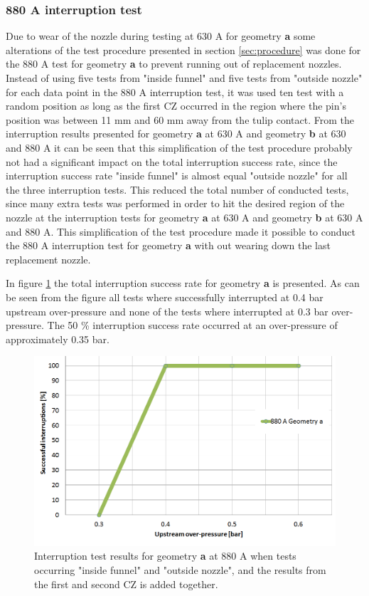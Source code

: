 \documentclass[10pt,b5paper,twoside]{article}
\begin{document}
\subsubsection*{880 A interruption test}
Due to wear of the nozzle during testing at 630 A for geometry \textbf{a} some alterations of the test procedure presented in section \ref{sec:procedure} was done for the 880 A test for geometry \textbf{a} to prevent running out of replacement nozzles. Instead of using five tests from "inside funnel" and five tests from "outside nozzle" for each data point in the 880 A interruption test, it was used ten test with a random position as long as the first CZ occurred in the region where the pin's position was between 11 mm and 60 mm away from the tulip contact. From the interruption results presented for geometry \textbf{a} at 630 A and geometry \textbf{b} at 630 and 880 A it can be seen that this simplification of the test procedure probably not had a significant impact on the total interruption success rate, since the interruption success rate "inside funnel" is almost equal "outside nozzle" for all the three interruption tests. This reduced the total number of conducted tests, since many extra tests was performed in order to hit the desired region of the nozzle at the interruption tests for geometry \textbf{a} at 630 A and geometry \textbf{b} at 630 A and 880 A. This simplification of the test procedure made it possible to conduct the 880 A interruption test for geometry \textbf{a} with out wearing down the last replacement nozzle.

In figure \ref{fig:results880AgeoA} the total interruption success rate for geometry \textbf{a} is presented. As can be seen from the figure all tests where successfully interrupted at 0.4 bar upstream over-pressure and none of the tests where interrupted at 0.3 bar over-pressure. The 50 \% interruption success rate occurred at an over-pressure of approximately 0.35 bar.


\begin{figure}[H]
\centering
\includegraphics[scale=0.45]{Bilder/Results/geoA880Anew.PNG}
\caption{Interruption test results for geometry \textbf{a} at 880 A when tests occurring "inside funnel" and "outside nozzle", and the results from the first and second CZ is added together.} \label{fig:results880AgeoA}
\end{figure}
\end{document}
